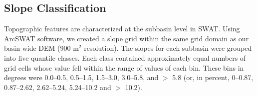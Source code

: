 \subsection{Slope Classification}\label{sec:slope}

Topographic features are characterized at the subbasin level in SWAT. 
Using ArcSWAT software, we created a slope grid within the same grid domain as our basin-wide DEM (900 m$^2$ resolution). 
The slopes for each subbasin were grouped into five quantile classes.
Each class contained approximately equal numbers of grid cells whose value fell within the range of values of each bin. 
These bins in degrees were 0.0--0.5, 0.5--1.5, 1.5--3.0, 3.0--5.8, and $>$ 5.8 
(or, in percent, 0--0.87, 0.87--2.62, 2.62--5.24, 5.24--10.2 and $>$ 10.2).